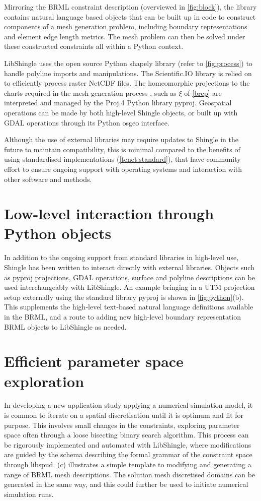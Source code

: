 \documentclass[a4paper, 10pt]{book}
\providecommand{\shingle}{Shingle\xspace}
\providecommand{\libshingle}{LibShingle\xspace}
\providecommand{\brml}{BRML\xspace}
\begin{document}
Mirroring the \brml constraint description (overviewed in \cref{fig:block}),
the library contains natural language based objects that can be built up
in code to construct components of a mesh generation problem,
including boundary representations and element edge length metrics.
%
The mesh problem can then be solved under these constructed constraints all within a Python context.

\libshingle uses the open source Python shapely library
(refer to \cref{fig:process})
to handle polyline imports and manipulations.
The Scientific.IO library is relied on to efficiently process raster NetCDF files.
%
The homeomorphic projections to the charts required in the mesh generation process \cite[see][]{candybrep},
such as $\xi$ of \cref{brep} are interpreted and managed by the Proj.4 Python library pyproj.
Geospatial operations can be made by both high-level \shingle objects, or built up with
GDAL
operations through its Python osgeo interface.
%

Although the use of external libraries may require updates to \shingle in the future to maintain compatibility, 
this is minimal compared to the benefits
of using standardised implementations (\cref{tenet:standard}), that have community effort to ensure ongoing support with operating systems and interaction with other software and methods.

\section{Low-level interaction through Python objects}
%
In addition to the ongoing support from standard libraries in high-level use,
\shingle has been written to interact directly with external libraries.
%
Objects such as pyproj projections, GDAL operations, surface and polyline descriptions can be used interchangeably with \libshingle.
An example bringing in a UTM projection setup externally using the standard library pyproj is shown in \cref{fig:python}(b).
This supplements the high-level text-based natural language definitions available in the \brml,
and a route to adding new high-level
boundary representation \brml objects to \libshingle as needed.



\section{Efficient parameter space exploration}
In developing a new application study applying a numerical simulation model,
it is common to iterate on a spatial discretisation until it is optimum and fit for purpose.
%
This involves small changes in the constraints, exploring parameter space often through
a loose bisecting binary search algorithm.
%
This process can be rigorously implemented and automated with \libshingle,
where modifications are guided by the schema describing the formal grammar of the constraint space through libspud.
%
(c) illustrates a simple template to modifying and generating a range of \brml mesh descriptions.
%
The solution mesh discretised domains can be generated in the same way,
and this could further be used to initiate numerical simulation runs.
\end{document}
